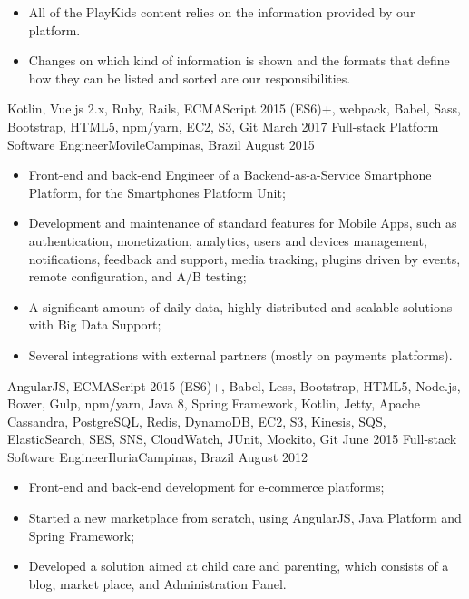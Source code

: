 \begin{experiences}
{\begin{itemize}
      \item All of the PlayKids content relies on the information provided by our platform.\\
      \item Changes on which kind of information is shown and the formats that define how they can be listed and sorted are our responsibilities.
    \end{itemize}
  }
  {Kotlin, Vue.js 2.x, Ruby, Rails, ECMAScript 2015 (ES6)+, webpack, Babel, Sass, Bootstrap, HTML5, npm/yarn, EC2, S3, Git}
  \emptySeparator
  \experience
    {March 2017}   {Full-stack Platform Software Engineer}{Movile}{Campinas, Brazil}
    {August 2015} {
    \begin{itemize}
      \item Front-end and back-end Engineer of a Backend-as-a-Service Smartphone Platform,
      for the Smartphones Platform Unit;
      \item Development and maintenance of standard features for Mobile Apps, such as authentication,
      monetization, analytics, users and devices management, notifications, feedback and support,
      media tracking, plugins driven by events, remote configuration, and A/B testing;
      \item A significant amount of daily data, highly distributed and scalable solutions with Big Data Support;
      \item Several integrations with external partners (mostly on payments platforms).\\
    \end{itemize}
  }
  {AngularJS, ECMAScript 2015 (ES6)+, Babel, Less, Bootstrap, HTML5, Node.js, Bower, Gulp, npm/yarn, Java 8, Spring Framework, Kotlin, Jetty, Apache Cassandra, PostgreSQL, Redis, DynamoDB, EC2, S3, Kinesis, SQS, ElasticSearch, SES, SNS, CloudWatch, JUnit, Mockito, Git}
  \emptySeparator
  \experience
    {June 2015} {Full-stack Software Engineer}{Iluria}{Campinas, Brazil}
    {August 2012}    {
      \begin{itemize}
        \item Front-end and back-end development for e-commerce platforms;
        \item Started a new marketplace from scratch, using AngularJS, Java Platform and Spring Framework;
        \item Developed a solution aimed at child care and parenting, which consists of a blog, market place, and Administration Panel.\\
      \end{itemize}
}
\end{experiences}
